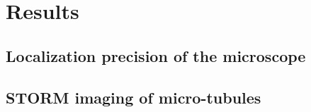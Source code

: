 \section{Results}
\subsection{Localization precision of the microscope}


\subsection{STORM imaging of micro-tubules}